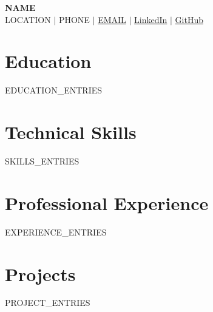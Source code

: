 \documentclass[letterpaper,11pt]{article}
\newcommand{\resumeSubHeadingListStart}{\begin{itemize}[leftmargin=0in, label={}]}
\newcommand{\resumeSubHeadingListEnd}{\end{itemize}}
\newcommand{\resumeItemListStart}{\begin{itemize}[leftmargin=0.15in]}
\newcommand{\resumeItemListEnd}{\end{itemize}\vspace{-5pt}}
\begin{document}
\begin{center}
    {\LARGE \scshape \bfseries {{NAME}} } \\[3pt]
    {{LOCATION}} $\mid$
    {{PHONE}} $\mid$
    \href{mailto:{{EMAIL}}}{{{EMAIL}}} $\mid$
    \href{{{LINKEDIN_URL}}}{LinkedIn} $\mid$
    \href{{{GITHUB_URL}}}{GitHub}
\end{center}

\section{Education}
\resumeSubHeadingListStart
  {{EDUCATION_ENTRIES}}
\resumeSubHeadingListEnd

\section{Technical Skills}
\resumeItemListStart
  {{SKILLS_ENTRIES}}
\resumeItemListEnd

\section{Professional Experience}
\resumeSubHeadingListStart
  {{EXPERIENCE_ENTRIES}}
\resumeSubHeadingListEnd

\section{Projects}
\resumeSubHeadingListStart
  {{PROJECT_ENTRIES}}
\resumeSubHeadingListEnd
\end{document}
